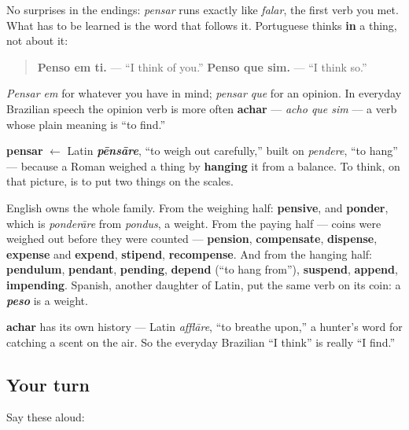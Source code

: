No surprises in the endings: \emph{pensar} runs exactly like \emph{falar}, the first verb you met. What has to be learned is the word that follows it. Portuguese thinks \textbf{in} a thing, not about it:

\begin{quote}
\textbf{Penso em ti.} — \textquotedblleft{}I think of you.\textquotedblright{} \textbf{Penso que sim.} — \textquotedblleft{}I think so.\textquotedblright{}
\end{quote}

\emph{Pensar em} for whatever you have in mind; \emph{pensar que} for an opinion. In everyday Brazilian speech the opinion verb is more often \textbf{achar} — \emph{acho que sim} — a verb whose plain meaning is \textquotedblleft{}to find.\textquotedblright{}

\begin{cousinweb}
\textbf{pensar} $\leftarrow$ Latin \emph{\textbf{pēnsāre}}, \textquotedblleft{}to weigh out carefully,\textquotedblright{} built on \emph{pendere}, \textquotedblleft{}to hang\textquotedblright{} — because a Roman weighed a thing by \textbf{hanging} it from a balance. To think, on that picture, is to put two things on the scales.

English owns the whole family. From the weighing half: \textbf{pensive}, and \textbf{ponder}, which is \emph{ponderāre} from \emph{pondus}, a weight. From the paying half — coins were weighed out before they were counted — \textbf{pension}, \textbf{compensate}, \textbf{dispense}, \textbf{expense} and \textbf{expend}, \textbf{stipend}, \textbf{recompense}. And from the hanging half: \textbf{pendulum}, \textbf{pendant}, \textbf{pending}, \textbf{depend} (\textquotedblleft{}to hang from\textquotedblright{}), \textbf{suspend}, \textbf{append}, \textbf{impending}. Spanish, another daughter of Latin, put the same verb on its coin: a \emph{\textbf{peso}} is a weight.

\textbf{achar} has its own history — Latin \emph{afflāre}, \textquotedblleft{}to breathe upon,\textquotedblright{} a hunter's word for catching a scent on the air. So the everyday Brazilian \textquotedblleft{}I think\textquotedblright{} is really \textquotedblleft{}I find.\textquotedblright{}
\end{cousinweb}

\subsection*{Your turn}
Say these aloud:

